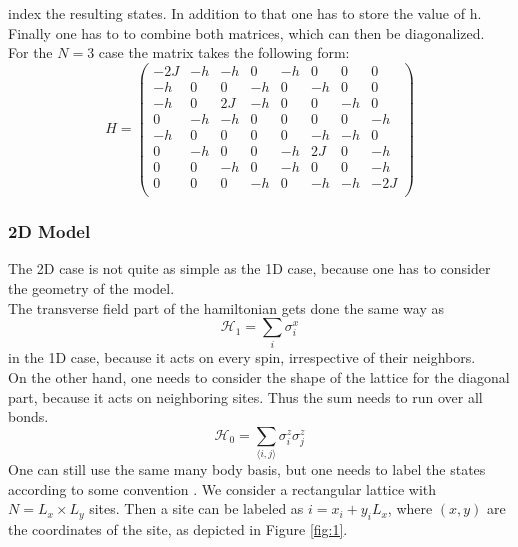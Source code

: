\documentclass{article}
\begin{document}
index the resulting states. In addition to that one has to store the value of h.\\
Finally one has to to combine both matrices, which can then be
diagonalized.\\
For the $N = 3$ case the matrix takes the following form:
\begin{equation*}
\label{eq:23}
H = 
\begin{pmatrix}
-2J & -h & -h &  0& -h & 0 &0 &0 \\
-h &0 &0 & -h &  0& -h & 0& 0\\
-h & 0& 2J & -h & 0& 0& -h &0 \\
 0& -h & -h&0 & 0& 0& 0& -h\\
-h &0 &0 &0 &0 & -h & -h &0 \\
 0& -h &0 &0 & -h & 2J &0 & -h\\
 0& 0& -h & 0& -h &0 &0 & -h\\
 0& 0& 0& -h & 0& -h & -h & -2J\\
\end{pmatrix}
\end{equation*}

\subsubsection{2D Model}
The 2D case is not quite as simple as the 1D case, because one has to
consider the geometry of the model.\\
The transverse field part of the hamiltonian gets done the same way as
\begin{equation}
\label{eq:25}
\mathcal{H}_1 = \sum\limits_i \sigma_i^x
\end{equation}
in the 1D case, because it acts on every spin, irrespective of
their neighbors.\\
On the other hand, one needs to consider the shape of the lattice for
the diagonal part, because it acts on neighboring sites. Thus the sum
needs to run over all bonds.
\begin{equation}
\label{eq:26}
\mathcal{H}_0 = \sum\limits_{\langle i,j \rangle} \sigma_i^z \sigma_j^z
\end{equation}
One can still use the same many body basis, but one needs to label the
states according to some convention \cite{Sandvik}. We consider a rectangular lattice
with $N = L_x \times L_y$ sites. Then a site can be labeled as $i =
x_i + y_iL_x$, where $(x,y)$ are the coordinates of the site, as
depicted in Figure \eqref{fig:1}.
\end{document}
